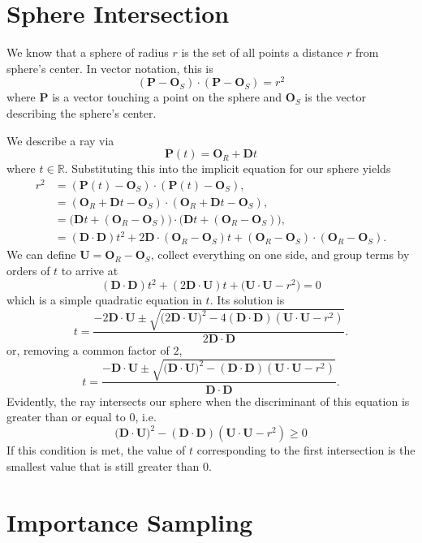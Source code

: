 \documentclass{article}
\begin{document}
\section*{Sphere Intersection}
We know that a sphere of radius $r$ is the set of all points a distance $r$ from sphere's center. In vector notation, this is
\[
	(\mathbf{P} - \mathbf{O}_S)\cdot(\mathbf{P} - \mathbf{O}_S) = r^2
\]
where $\mathbf{P}$ is a vector touching a point on the sphere and $\mathbf{O}_S$ is the vector describing the sphere's center.

We describe a ray via
\[
	\mathbf{P}(t) = \mathbf{O}_R + \mathbf{D}t
\]
where $t \in \mathbb{R}$. Substituting this into the implicit equation for our sphere yields
\begin{align*}
		r^2 &= (\mathbf{P}(t) - \mathbf{O}_S)\cdot(\mathbf{P}(t) - \mathbf{O}_S), \\
		&= (\mathbf{O}_R + \mathbf{D}t - \mathbf{O}_S)\cdot(\mathbf{O}_R + \mathbf{D}t - \mathbf{O}_S), \\
		&= \big(\mathbf{D}t + (\mathbf{O}_R - \mathbf{O}_S)\big) \cdot \big(\mathbf{D}t + (\mathbf{O}_R - \mathbf{O}_S)\big), \\
		&= (\mathbf{D}\cdot\mathbf{D})t^2 + 2\mathbf{D}\cdot(\mathbf{O}_R - \mathbf{O}_S)t + (\mathbf{O}_R - \mathbf{O}_S)\cdot(\mathbf{O}_R - \mathbf{O}_S).
\end{align*}
We can define $\mathbf{U} = \mathbf{O}_R - \mathbf{O}_S$, collect everything on one side, and group terms by orders of $t$ to arrive at
\[
	(\mathbf{D}\cdot\mathbf{D})t^2 + (2\mathbf{D}\cdot\mathbf{U})t + \big(\mathbf{U}\cdot\mathbf{U}- r^2\big) = 0
\]
which is a simple quadratic equation in $t$. Its solution is
\[
	t = \frac{-2\mathbf{D}\cdot\mathbf{U} \pm \sqrt{\big(2\mathbf{D}\cdot\mathbf{U}\big)^2 - 4(\mathbf{D}\cdot\mathbf{D})(\mathbf{U}\cdot\mathbf{U} - r^2)}}{2\mathbf{D}\cdot\mathbf{D}}.
\]
or, removing a common factor of $2$, 
\[
t = \frac{-\mathbf{D}\cdot\mathbf{U} \pm \sqrt{\big(\mathbf{D}\cdot\mathbf{U}\big)^2 - (\mathbf{D}\cdot\mathbf{D})(\mathbf{U}\cdot\mathbf{U} - r^2)}}{\mathbf{D}\cdot\mathbf{D}}.
\]
Evidently, the ray intersects our sphere when the discriminant of this equation is greater than or equal to $0$, i.e.
\[
	\big(\mathbf{D}\cdot\mathbf{U}\big)^2 - (\mathbf{D}\cdot\mathbf{D})(\mathbf{U}\cdot\mathbf{U} - r^2) \geq 0
\]
If this condition is met, the value of $t$ corresponding to the first intersection is the smallest value that is still greater than $0$.

\section*{Importance Sampling}
\end{document}
